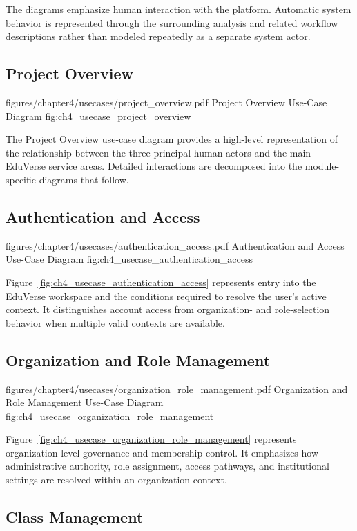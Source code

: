 The diagrams emphasize human interaction with the platform. Automatic system
behavior is represented through the surrounding analysis and related workflow
descriptions rather than modeled repeatedly as a separate system actor.

\subsection*{Project Overview}

\EduUseCasePdfFigure
  {figures/chapter4/usecases/project_overview.pdf}
  {Project Overview Use-Case Diagram}
  {fig:ch4_usecase_project_overview}

The Project Overview use-case diagram provides a high-level representation of
the relationship between the three principal human actors and the main
EduVerse service areas. Detailed interactions are decomposed into the
module-specific diagrams that follow.

\subsection*{Authentication and Access}

\EduUseCasePdfFigure
  {figures/chapter4/usecases/authentication_access.pdf}
  {Authentication and Access Use-Case Diagram}
  {fig:ch4_usecase_authentication_access}

Figure~\ref{fig:ch4_usecase_authentication_access} represents entry into the
EduVerse workspace and the conditions required to resolve the user's active
context. It distinguishes account access from organization- and role-selection
behavior when multiple valid contexts are available.

\subsection*{Organization and Role Management}

\EduUseCasePdfFigure
  {figures/chapter4/usecases/organization_role_management.pdf}
  {Organization and Role Management Use-Case Diagram}
  {fig:ch4_usecase_organization_role_management}

Figure~\ref{fig:ch4_usecase_organization_role_management} represents
organization-level governance and membership control. It emphasizes how
administrative authority, role assignment, access pathways, and institutional
settings are resolved within an organization context.

\subsection*{Class Management}

